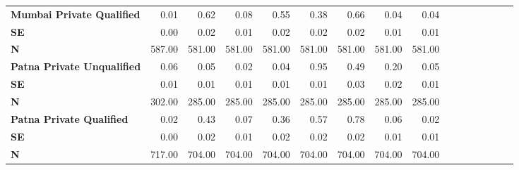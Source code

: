 \begin{tabular}{@{\extracolsep{5pt}}lrrrrrrrrrrrrrrr}
{\bf Mumbai Private Qualified} & 0.01\phantom{***} & 0.62\phantom{***} & 0.08\phantom{***} & 0.55\phantom{***} & 0.38\phantom{***} & 0.66\phantom{***} & 0.04\phantom{***} & 0.04\phantom{***} \\
{\bf SE} & 0.00\phantom{***} & 0.02\phantom{***} & 0.01\phantom{***} & 0.02\phantom{***} & 0.02\phantom{***} & 0.02\phantom{***} & 0.01\phantom{***} & 0.01\phantom{***} \\
{\bf N} & 587.00\phantom{***} & 581.00\phantom{***} & 581.00\phantom{***} & 581.00\phantom{***} & 581.00\phantom{***} & 581.00\phantom{***} & 581.00\phantom{***} & 581.00\phantom{***} \\
{\bf Patna Private Unqualified} & 0.06\phantom{***} & 0.05\phantom{***} & 0.02\phantom{***} & 0.04\phantom{***} & 0.95\phantom{***} & 0.49\phantom{***} & 0.20\phantom{***} & 0.05\phantom{***} \\
{\bf SE} & 0.01\phantom{***} & 0.01\phantom{***} & 0.01\phantom{***} & 0.01\phantom{***} & 0.01\phantom{***} & 0.03\phantom{***} & 0.02\phantom{***} & 0.01\phantom{***} \\
{\bf N} & 302.00\phantom{***} & 285.00\phantom{***} & 285.00\phantom{***} & 285.00\phantom{***} & 285.00\phantom{***} & 285.00\phantom{***} & 285.00\phantom{***} & 285.00\phantom{***} \\
{\bf Patna Private Qualified} & 0.02\phantom{***} & 0.43\phantom{***} & 0.07\phantom{***} & 0.36\phantom{***} & 0.57\phantom{***} & 0.78\phantom{***} & 0.06\phantom{***} & 0.02\phantom{***} \\
{\bf SE} & 0.00\phantom{***} & 0.02\phantom{***} & 0.01\phantom{***} & 0.02\phantom{***} & 0.02\phantom{***} & 0.02\phantom{***} & 0.01\phantom{***} & 0.01\phantom{***} \\
{\bf N} & 717.00\phantom{***} & 704.00\phantom{***} & 704.00\phantom{***} & 704.00\phantom{***} & 704.00\phantom{***} & 704.00\phantom{***} & 704.00\phantom{***} & 704.00\phantom{***} \\
\hline
\end{tabular}
